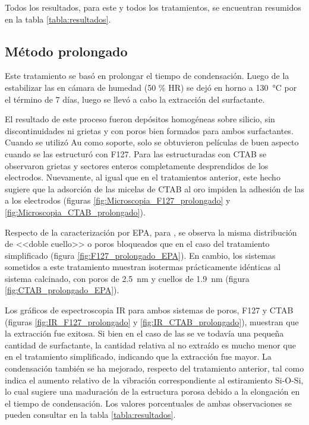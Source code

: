 			 Todos los resultados, para este y todos los tratamientos, se encuentran resumidos en la tabla \ref{tabla:resultados}.

	 \subsection{Método prolongado}

	 	 Este tratamiento se basó en prolongar el tiempo de condensación. Luego de la estabilizar las \pdm\space en cámara de humedad (50 \% HR) se dejó en horno a \SI{130}{\celsius} por el término de 7 días, luego se llevó a cabo la extracción del surfactante.

	 	 El resultado de este proceso fueron depósitos homogéneas sobre silicio, sin discontinuidades ni grietas y con poros bien formados para ambos surfactantes. Cuando se utilizó Au como soporte, solo se obtuvieron películas de buen aspecto cuando se las estructuró con F127. Para las estructuradas con CTAB se observaron grietas y sectores enteros completamente desprendidos de los electrodos. Nuevamente, al igual que en el tratamientos anterior, este hecho sugiere que la adsorción de las micelas de CTAB al oro impiden la adhesión de las \pdmC\space a los electrodos (figuras \ref{fig:Microscopia_F127_prolongado} y \ref{fig:Microscopia_CTAB_prolongado}).

	 	 Respecto de la caracterización por EPA, para \pdmF, se observa la misma distribución de <<doble cuello>> o poros bloqueados que en el caso del tratamiento simplificado (figura \ref{fig:F127_prolongado_EPA}). En cambio, los sistemas \pdmC\space sometidos a este tratamiento muestran isotermas prácticamente idénticas al sistema calcinado, con poros de \SI{2,5}{nm} y cuellos de \SI{1,9}{nm} (figura \ref{fig:CTAB_prolongado_EPA}).

	 	 Los gráficos de espectroscopia IR para ambos sistemas de poros, F127 y CTAB (figuras \ref{fig:IR_F127_prolongado} y \ref{fig:IR_CTAB_prolongado}), muestran que la extracción fue exitosa. Si bien en el caso de las \pdmC\space se ve todavía una pequeña cantidad de surfactante, la cantidad relativa al no extraído es mucho menor que en el tratamiento simplificado, indicando que la extracción fue mayor. La condensación también se ha mejorado, respecto del tratamiento anterior, tal como indica el aumento relativo de la vibración correspondiente al estiramiento Si-O-Si, lo cual sugiere una maduración de la estructura porosa debido a la elongación en el tiempo de condensación. Los valores porcentuales de ambas observaciones se pueden consultar en la tabla \ref{tabla:resultados}.

